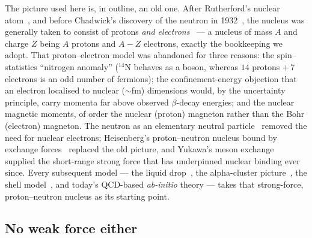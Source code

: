 \documentclass[11pt]{article}
\begin{document}
The picture used here is, in outline, an old one. After Rutherford's nuclear
atom~\cite{Rutherford1911}, and before Chadwick's discovery of the neutron in
1932~\cite{Chadwick1932}, the nucleus was generally taken to consist of protons \emph{and
electrons}~\cite{BetheBacher1936} --- a nucleus of mass $A$ and charge $Z$ being $A$ protons and
$A-Z$ electrons, exactly the bookkeeping we adopt. That proton--electron model was abandoned for three reasons:
the spin--statistics ``nitrogen anomaly'' ($^{14}$N behaves as a boson, whereas $14$ protons
$+\,7$ electrons is an odd number of fermions); the confinement-energy objection that an
electron localised to nuclear ($\sim$fm) dimensions would, by the uncertainty principle, carry
momenta far above observed $\beta$-decay energies; and the nuclear magnetic moments, of order
the nuclear (proton) magneton rather than the Bohr (electron) magneton. The neutron as an
elementary neutral particle~\cite{Iwanenko1932} removed the need for nuclear electrons;
Heisenberg's proton--neutron nucleus bound by exchange forces~\cite{Heisenberg1932} replaced the
old picture, and Yukawa's meson exchange~\cite{Yukawa1935} supplied the short-range strong force
that has underpinned nuclear binding ever since. Every subsequent model --- the liquid
drop~\cite{Weizsacker1935}, the alpha-cluster picture~\cite{Wheeler1937,HafstadTeller1938}, the
shell model~\cite{Mayer1949,Haxel1949}, and today's QCD-based \emph{ab-initio} theory --- takes
that strong-force, proton--neutron nucleus as its starting point.

\subsection{No weak force either}
\end{document}

